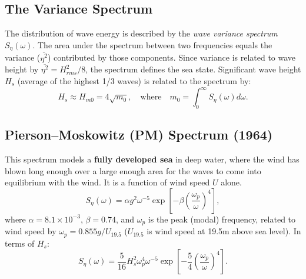\documentclass[11pt,letterpaper]{article}
\begin{document}
\subsection{The Variance Spectrum}
The distribution of wave energy is described by the \emph{wave variance spectrum} $S_\eta(\omega)$. The area under the spectrum between two frequencies equals the variance ($\overline{\eta^2}$) contributed by those components. Since variance is related to wave height by $\overline{\eta^2} = H_{rms}^2/8$, the spectrum defines the sea state. Significant wave height $H_s$ (average of the highest 1/3 waves) is related to the spectrum by:
\begin{equation}
H_s \approx H_{m0} = 4\sqrt{m_0}, \quad \text{where} \quad m_0 = \int_0^\infty S_\eta(\omega)  d\omega.
\end{equation}

\subsection{Pierson–Moskowitz (PM) Spectrum (1964)}
This spectrum models a \textbf{fully developed sea} in deep water, where the wind has blown long enough over a large enough area for the waves to come into equilibrium with the wind. It is a function of wind speed $U$ alone.
\begin{equation}
S_\eta(\omega) = \alpha g^2 \omega^{-5} \exp\left[-\beta \left(\frac{\omega_p}{\omega}\right)^4\right],
\end{equation}
where $\alpha = 8.1\times10^{-3}$, $\beta=0.74$, and $\omega_p$ is the peak (modal) frequency, related to wind speed by $\omega_p = 0.855 g / U_{19.5}$ ($U_{19.5}$ is wind speed at 19.5m above sea level). In terms of $H_s$:
\begin{equation}
S_\eta(\omega) = \frac{5}{16} H_s^2 \omega_p^4 \omega^{-5} \exp\left[-\frac{5}{4}\left(\frac{\omega_p}{\omega}\right)^4\right].
\end{equation}
\end{document}

